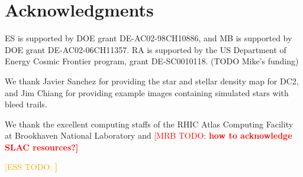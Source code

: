 \documentclass[iop, twocolappendix, appendixfloats, numberedappendix, apj]{hackemulateapj}
\newcommand{\mattodo}[1]{\textcolor{red}{[MRB TODO: \bf #1]}}
\newcommand{\esstodo}[1]{\textcolor{orange}{[ESS TODO: \bf #1]}}
\begin{document}
%



\section*{Acknowledgments}

ES is supported by DOE grant DE-AC02-98CH10886, and MB is supported by DOE
grant DE-AC02-06CH11357.  RA is supported by the US Department of Energy Cosmic
Frontier program, grant DE-SC0010118.  (TODO Mike's funding)

We thank Javier Sanchez for providing the star and stellar density map for DC2,
and Jim Chiang for providing example images containing simulated stars
with bleed trails.

We thank the excellent computing staffs of the RHIC Atlas Computing Facility at
Brookhaven National Laboratory and \mattodo{how to acknowledge SLAC resources?}

\esstodo{}


%
%
%
%


\end{document}
